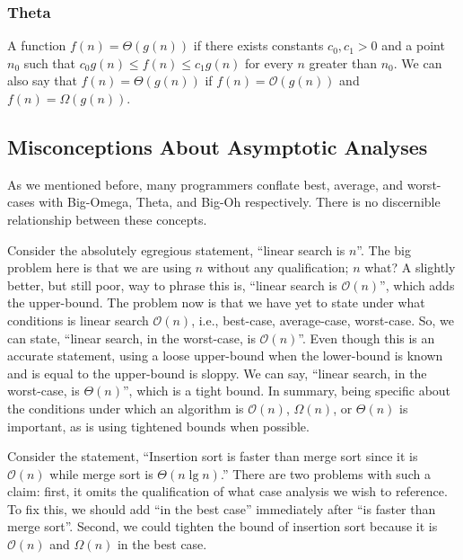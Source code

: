 \subsubsection*{Theta}
A function $f(n) = \Theta(g(n))$ if there exists constants $c_0, c_1 > 0$ and a point $n_0$ such that $c_0g(n) \leq f(n) \leq c_1g(n)$ for every $n$ greater than $n_0$. We can also say that $f(n) = \Theta(g(n))$ if $f(n) = \mathcal{O}(g(n))$ and $f(n) = \Omega(g(n))$.

\noindent{}

\subsection*{Misconceptions About Asymptotic Analyses}

As we mentioned before, many programmers conflate best, average, and worst-cases with Big-Omega, Theta, and Big-Oh respectively. There is no discernible relationship between these concepts.

\example Consider the absolutely egregious statement, ``linear search is $n$''. The big problem here is that we are using $n$ without any qualification; $n$ what? A slightly better, but still poor, way to phrase this is, ``linear search is $\mathcal{O}(n)$'', which adds the upper-bound. The problem now is that we have yet to state under what conditions is linear search $\mathcal{O}(n)$, i.e., best-case, average-case, worst-case. So, we can state, ``linear search, in the worst-case, is $\mathcal{O}(n)$''. Even though this is an accurate statement, using a loose upper-bound when the lower-bound is known and is equal to the upper-bound is sloppy. We can say, ``linear search, in the worst-case, is $\Theta(n)$'', which is a tight bound. In summary, being specific about the conditions under which an algorithm is $\mathcal{O}(n)$, $\Omega(n)$, or $\Theta(n)$ is important, as is using tightened bounds when possible.

\example Consider the statement, ``Insertion sort is faster than merge sort since it is $\mathcal{O}(n)$ while merge sort is $\Theta(n\lg{n})$.'' There are two problems with such a claim: first, it omits the qualification of what case analysis we wish to reference. To fix this, we should add ``in the best case'' immediately after ``is faster than merge sort''. Second, we could tighten the bound of insertion sort because it is $\mathcal{O}(n)$ and $\Omega(n)$ in the best case.

